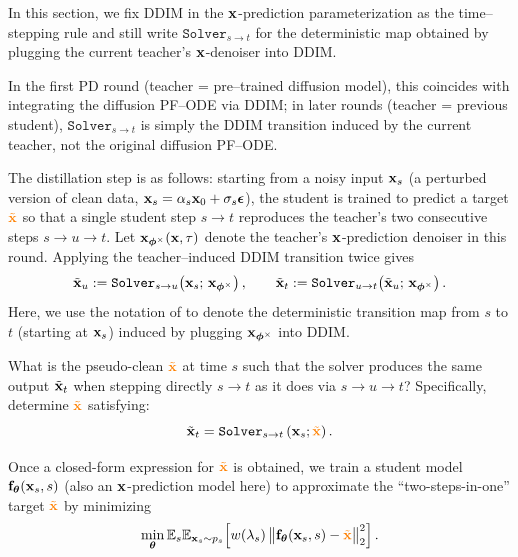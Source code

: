 In this section, we fix DDIM in the ${\mathbf{x}}$-prediction parameterization as the time–stepping rule and still write $\mathtt{Solver}_{s \to t}$ for the deterministic map obtained by plugging the current teacher’s ${\mathbf{x}}$-denoiser into DDIM.


In the first PD round (teacher = pre–trained diffusion model), this coincides with integrating the diffusion PF–ODE via DDIM; in later rounds (teacher = previous student), $\mathtt{Solver}_{s \to t}$ is simply the DDIM transition induced by the current teacher, not the original diffusion PF–ODE.


The distillation step is as follows: starting from a noisy input ${\mathbf{x}}_s$ (a perturbed version of clean data, ${\mathbf{x}}_s = \alpha_s {\mathbf{x}}_0 + \sigma_s \bm{\epsilon}$), the student is trained to predict a target ${\color{orange}\tilde{{\mathbf{x}}}}$ so that a single student step $s\!\to\! t$ reproduces the teacher’s two consecutive steps $s\!\to\! u\!\to\! t$.
Let ${\mathbf{x}}_{\bm{\phi}^\times}({\mathbf{x}},\tau)$ denote the teacher’s ${\mathbf{x}}$-prediction denoiser in this round.
Applying the teacher–induced DDIM transition twice gives
\[
\tilde{{\mathbf{x}}}_u := \mathtt{Solver}_{s\to u}\!\left({\mathbf{x}}_s;\,{\mathbf{x}}_{\bm{\phi}^\times}\right),
\qquad
\tilde{{\mathbf{x}}}_t := \mathtt{Solver}_{u\to t}\!\left(\tilde{{\mathbf{x}}}_u;\,{\mathbf{x}}_{\bm{\phi}^\times}\right).
\]
Here, we use the notation of  to denote the deterministic transition map from $s$ to $t$ (starting at ${\mathbf{x}}_s$) induced by plugging ${\mathbf{x}}_{\bm{\phi}^\times}$ into DDIM.

\begin{question}
What is the pseudo-clean ${\color{orange}\tilde{{\mathbf{x}}}}$ at time $s$ such that the solver produces the same output $\tilde{{\mathbf{x}}}_t$ when stepping directly $s \to t$ as it does via $s \to u \to t$? Specifically, determine ${\color{orange}\tilde{{\mathbf{x}}}}$ satisfying:
\[
\tilde{{\mathbf{x}}}_t = \mathtt{Solver}_{s\to t}\left({\mathbf{x}}_s; {\color{orange}\tilde{{\mathbf{x}}}}\right).
\]
\end{question}





Once a closed-form expression for ${\color{orange}\tilde{{\mathbf{x}}}}$ is obtained, we train a student model ${\mathbf{f}}_{\bm{\theta}}({\mathbf{x}}_s, s)$ (also an ${\mathbf{x}}$-prediction model here) to approximate the ``two-steps-in-one'' target ${\color{orange}\tilde{{\mathbf{x}}}}$ by minimizing
\begin{align}\label{eq:pd-optimization}
\min_{\bm{\theta}} \mathbb{E}_s
\mathbb{E}_{{\mathbf{x}}_s\sim p_s}\!\left[w(\lambda_s)\,\big\|{\mathbf{f}}_{\bm{\theta}}({\mathbf{x}}_s, s) - {\color{orange}\tilde{{\mathbf{x}}}}\big\|_2^2\right].
\end{align}


